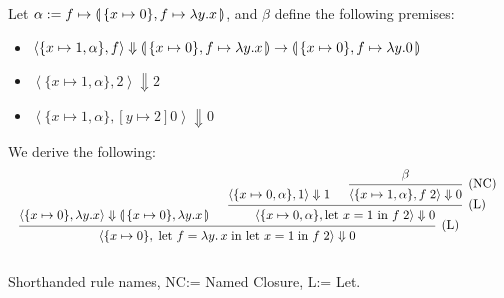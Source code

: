 \begin{Example}

    Let $\alpha:= f \mapsto \llparenthesis\,\{x \mapsto 0\},f\mapsto \lambda y.x\,\rrparenthesis$, and $\beta$ define the following premises:
    \begin{itemize}
        \item $\left\langle \{x \mapsto 1, \alpha\}, f \right\rangle \Downarrow \llparenthesis\, \{x \mapsto 0\},f\mapsto\lambda y.x \,\rrparenthesis\to\llparenthesis\, \{x \mapsto 0\},f\mapsto\lambda y.0 \,\rrparenthesis$
        \item $\left\langle \{x \mapsto 1, \alpha\}, 2 \right\rangle \Downarrow 2$
        \item $\left\langle \{x \mapsto 1, \alpha\},[y\mapsto 2]0 \right\rangle \Downarrow 0$
    \end{itemize}
    \noindent
    We derive the following:
\[
\resizebox{\textwidth}{!}{%
    \begin{prooftree}
        \hypo{\left\langle \{x \mapsto 0 \},\lambda y.x\right\rangle\Downarrow \llp\{x \mapsto 0 \},\lambda y.x\rrp}
        \hypo{\left\langle \{x \mapsto 0, \alpha\}, 1 \right\rangle \Downarrow 1}
        
        \hypo{\beta }
        \infer1[(NC)]{\left\langle \{x \mapsto 1, \alpha\}, f\; 2 \right\rangle \Downarrow 0}
        \infer2[\text{(L)}]{\left\langle \{x \mapsto 0, \alpha\},\text{let } x = 1\text{ in } f\; 2 \right\rangle \Downarrow 0}
        \infer2[\text{(L)}]{\left\langle \{ x \mapsto 0 \},\; \text{let } f = \lambda y.\,x\; \text{in let } x = 1\; \text{in } f\; 2 \right\rangle \Downarrow 0}
    \end{prooftree}
    }\]
    \\
    \noindent
    Shorthanded rule names, NC:= Named Closure, L:= Let.
\end{Example}
